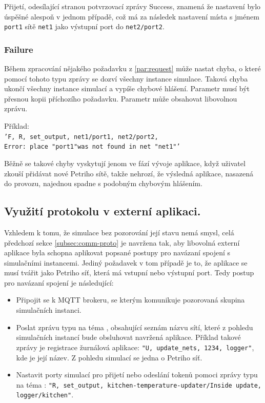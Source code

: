 Přijetí, odesílající stranou potvrzovací zprávy Success, znamená že nastavení bylo úspěšné alespoň v jednom případě, což má za následek nastavení místa s jménem \texttt{port1} sítě \texttt{net1} jako výstupní port do \texttt{net2/port2}.

\subsubsection{Failure} Během zpracování nějakého požadavku z \ref{par:request} může nastat chyba, o které pomocí tohoto typu zprávy se dozví všechny instance simulace. Taková chyba ukončí všechny instance simulací a vypíše chybové hlášení. Parametr  musí být přesnou kopii příchozího požadavku. Parametr  může obsahovat libovolnou zprávu.

\begin{tabbing}
 Příklad: \= \\
 \> \texttt{'F, R, set\_output, net1/port1, net2/port2, }\\
 \> \texttt{Error: place "port1"\space was not found in net "net1"'} \\
\end{tabbing}

Běžně se takové chyby vyskytují jenom ve fází vývoje aplikace, když uživatel zkouší přidávat nové Petriho sítě, takže nehrozí, že výsledná aplikace, nasazená do provozu, najednou spadne s podobným chybovým hlášením.

\subsection{Využití protokolu v externí aplikaci.}
\label{subsec:external-app}
Vzhledem k tomu, že simulace bez pozorování její stavu nemá smysl, celá předchozí sekce \ref{subsec:comm-proto} je navržena tak, aby libovolná externí aplikace byla schopna aplikovat popsané postupy pro navázaní spojení s simulačními instancemi. Jediný požadavek v tom případě je to, že aplikace se musí tvářit jako Petriho síť, která má vstupní nebo výstupní port. Tedy postup pro navázaní spojení je následující:
\begin{itemize}
  \item Připojit se k MQTT brokeru, se kterým komunikuje pozorovaná skupina simulačních instanci.
  \item Poslat zprávu typu  na téma , obsahující seznám názvu sítí, které z pohledu simulačních instancí bude obsluhovat navržená aplikace. Příklad takové zprávy je registrace žurnálová aplikace: \texttt{"U, update\_nets, 1234, logger"}, kde  je její název. Z pohledu simulací se jedna o Petriho síť.
  \item Nastavit porty simulací pro přijetí nebo odeslání tokenů pomoci zprávy typu  na téma : \texttt{"R, set\_output, kitchen-temperature-updater/Inside update, logger/kitchen"}.
\end{itemize}

